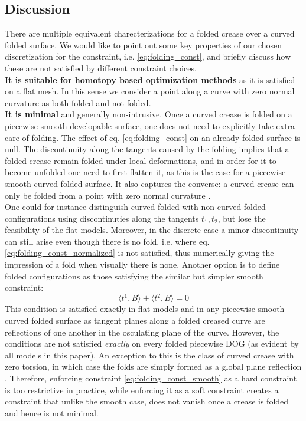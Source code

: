 \subsection{Discussion}
There are multiple equivalent charecterizations for a folded crease over a curved folded surface. We would like to point out some key properties of our chosen discretization for the constraint, i.e. \eqref{eq:folding_const}, and briefly discuss how these are not satisfied by different constraint choices. \\
\textbf{It is suitable for homotopy based optimization methods} as it is satisfied on a flat mesh. In this sense we consider a point along a curve with zero normal curvature as both folded and not folded. \\ 
\textbf{It is minimal} and generally non-intrusive. Once a curved crease is folded on a piecewise smooth developable surface, one does not need to explicitly take extra care of folding. The effect of eq. \eqref{eq:folding_const} on an already-folded surface is null. The discontinuity along the tangents caused by the folding implies that a folded crease remain folded under local deformations, and in order for it to become unfolded one need to first flatten it, as this is the case for a piecewise smooth curved folded surface. It also captures the converse: a curved crease can only be folded from a point with zero normal curvature \cite{more_on_paper}. \\
One could for instance distinguish curved folded with non-curved folded configurations using discontinuties along the tangents $t_1,t_2$, but lose the feasibility of the flat models. Moreover, in the discrete case a minor discontinuity can still arise even though there is no fold, i.e. where eq. \eqref{eq:folding_const_normalized} is not satisfied, thus numerically giving the impression of a fold when visually there is none. Another option is to define folded configurations as those satisfying the similar but simpler smooth constraint:
\begin{equation} \label{eq:folding_const_smooth} 
\langle t^1,B\rangle + \langle t^2,B\rangle = 0
\end{equation}
This condition is satisfied exactly in flat models and in any piecewise smooth curved folded surface as tangent planes along a folded creased curve are reflections of one another in the osculating plane of the curve. However, the conditions are not satisfied \emph{exactly} on every folded piecewise DOG (as evident by all models in this paper). An exception to this is the class of curved crease with zero torsion, in which case the folds are simply formed as a global plane reflection \cite{Mitani_ref}. Therefore, enforcing constraint \eqref{eq:folding_const_smooth} as a hard constraint is too restrictive in practice, while enforcing it as a soft constraint creates a constraint that unlike the smooth case, does not vanish once a crease is folded and hence is not minimal.

